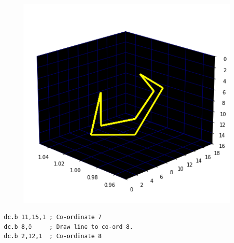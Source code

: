 \begin{minipage}[c]{0.48\linewidth}
\begin{figure}[H]
    \centering
    \begin{adjustbox}{width=5.5cm,center}
      \includegraphics[width=12cm]{src/claws/build_claw_7_0.png}%
    \end{adjustbox}
\end{figure}
\end{minipage}
\begin{minipage}[c]{0.48\linewidth}
\begin{lstlisting}[basicstyle=\scriptsize\ttfamily]
dc.b 11,15,1 ; Co-ordinate 7
dc.b 8,0     ; Draw line to co-ord 8.
dc.b 2,12,1  ; Co-ordinate 8
\end{lstlisting}
\vspace*{\fill}
\end{minipage}


